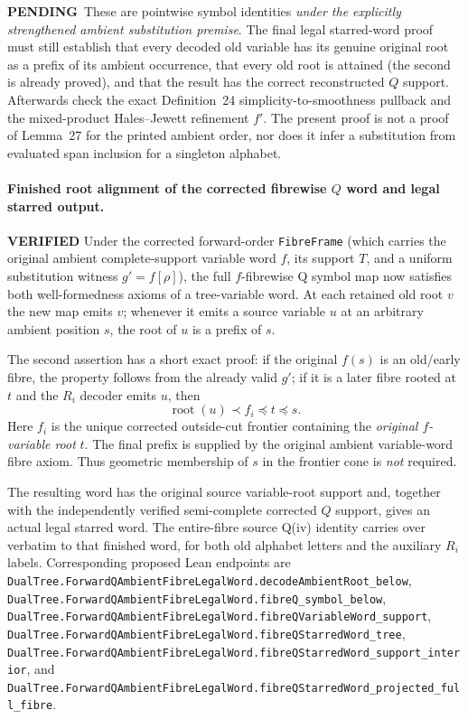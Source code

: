 \documentclass[11pt]{article}
\newcommand{\ok}{\textcolor{green!40!black}{\textbf{VERIFIED}}}
\newcommand{\todo}{\textcolor{gray!70!black}{\textbf{PENDING}}}
\newcommand{\lean}[1]{\texttt{#1}}
\begin{document}
\todo\ These are pointwise symbol identities \emph{under
the explicitly strengthened ambient substitution premise}.
The final legal starred-word proof must still establish that
every decoded old variable has its genuine original root
as a prefix of its ambient occurrence, that every old root
is attained (the second is already proved), and that the
result has the correct reconstructed $Q$ support. Afterwards
check the exact Definition~24 simplicity-to-smoothness pullback
and the mixed-product Hales--Jewett refinement $f'$.
The present proof is not a proof of Lemma~27 for the printed
ambient order, nor does it infer a substitution from evaluated
span inclusion for a singleton alphabet.


\paragraph{Finished root alignment of the corrected fibrewise $Q$
word and legal starred output.} \ok
Under the corrected forward-order \texttt{FibreFrame}
(which carries the original ambient complete-support variable
word $f$, its support $T$, and a uniform substitution witness
$g'=f[\rho]$), the full $f$-fibrewise Q symbol map now satisfies
both well-formedness axioms of a tree-variable word.
At each retained old root $v$ the new map emits $v$;
whenever it emits a source variable $u$ at an arbitrary
ambient position $s$, the root of $u$ is a prefix of $s$.

The second assertion has a short exact proof: if the original
$f(s)$ is an old/early fibre, the property follows from the
already valid $g'$; if it is a later fibre rooted at $t$ and the
$R_i$ decoder emits $u$, then
\[
    \operatorname{root}(u)
       \prec f_i\preceq t\preceq s.
\]
Here $f_i$ is the unique corrected outside-cut frontier
containing the \emph{original $f$-variable root} $t$.
The final prefix is supplied by the original ambient
variable-word fibre axiom. Thus geometric membership of
$s$ in the frontier cone is \emph{not} required.

The resulting word has the original source variable-root
support and, together with the independently verified
semi-complete corrected $Q$ support, gives an actual legal
starred word. The entire-fibre source Q(iv) identity carries
over verbatim to that finished word, for both old alphabet
letters and the auxiliary $R_i$ labels.
Corresponding proposed Lean endpoints are
\lean{DualTree.ForwardQAmbientFibreLegalWord.decodeAmbientRoot_below},
\lean{DualTree.ForwardQAmbientFibreLegalWord.fibreQ_symbol_below},
\lean{DualTree.ForwardQAmbientFibreLegalWord.fibreQVariableWord_support},
\lean{DualTree.ForwardQAmbientFibreLegalWord.fibreQStarredWord_tree},
\lean{DualTree.ForwardQAmbientFibreLegalWord.fibreQStarredWord_support_interior},
and
\lean{DualTree.ForwardQAmbientFibreLegalWord.fibreQStarredWord_projected_full_fibre}.
\end{document}
